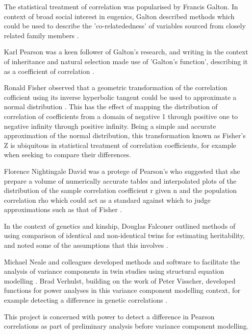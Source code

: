 The statistical treatment of correlation was popularised by Francis Galton.  In context of broad social interest in eugenics, Galton described methods which could be used to describe the 'co-relatededness' of variables sourced from closely related family members \cite{Galton1888,Galton1890}.  

Karl Pearson was a keen follower of Galton's research, and writing in the context of inheritance and natural selection made use of 'Galton's function', describing it as a coefficient of correlation \cite{Pearson1895}.  

Ronald Fisher observed that a geometric transformation of the correlation cofficient using its inverse hyperbolic tangent could be used to approximate a normal distribution \cite{Fisher1915}.  This has the effect of mapping the distribution of correlation of coefficients from a domain of negative 1 through positive one to negative infinity through positive infinity. Being a simple and accurate approximation of the normal distribution, this transformation known as Fisher's Z is ubiquitous in statistical treatment of correlation coefficients, for example when seeking to compare their differences.

Florence Nightingale David was a protege of Pearson's who suggested that she prepare a volume of numerically accurate tables and interpolated plots of the distribution of the sample correlation coefficient r given n and the population correlation rho which could act as a standard against which to judge approximations such as that of Fisher \cite{David1938}. 

In the context of genetics and kinship, Douglas Falconer outlined methods of using comparison of identical and non-identical twins for estimating heritability, and noted some of the assumptions that this involves \cite{Falconer1960}.

Michael Neale and colleagues developed methods and software to facilitate the analysis of variance components in twin studies using structural equation modelling \cite{Neale1992}.  Brad Verhulst, building on the work of Peter Visscher, developed functions for power analyses in this variance component modelling context, for example detecting a difference in genetic correlations \cite{Visscher2004,Visscher2008a}.

This project is concerned with power to detect a difference in Pearson correlations as part of preliminary analysis before variance component modelling.

